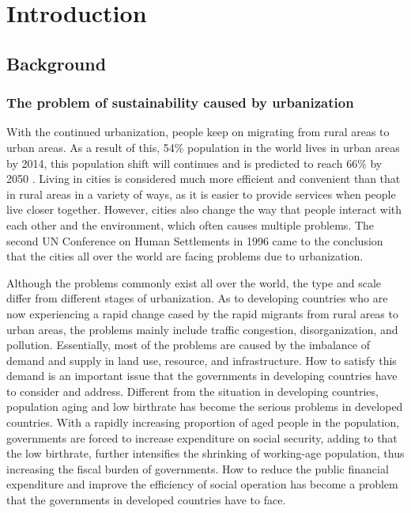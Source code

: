 \chapter{Introduction}

%
\section{Background}

\subsection{The problem of sustainability caused by urbanization}
With the continued urbanization, people keep on migrating from rural areas to urban areas. As a result of this, 54\% population in the world lives in urban areas by 2014, this population shift will continues and is predicted to reach 66\% by 2050 \cite{un2014world}. Living in cities is considered much more efficient and convenient than that in rural areas in a variety of ways, as it is easier to provide services when people live closer together. However, cities also change the way that people interact with each other and the environment, which often causes multiple problems. The second UN Conference on Human Settlements in 1996 came to the conclusion that the cities all over the world are facing problems due to urbanization.

Although the problems commonly exist all over the world, the type and scale differ from different stages of urbanization. As to developing countries who are now experiencing a rapid change cased by the rapid migrants from rural areas to urban areas, the problems mainly include traffic congestion, disorganization, and pollution. Essentially, most of the problems are caused by the imbalance of demand and supply in land use, resource, and infrastructure. How to satisfy this demand is an important issue that the governments in developing countries have to consider and address. Different from the situation in developing countries, population aging and low birthrate has become the serious problems in developed countries. With a rapidly increasing proportion of aged people in the population, governments are forced to increase expenditure on social security, adding to that the low birthrate, further intensifies the shrinking of working-age population, thus increasing the fiscal burden of governments. How to reduce the public financial expenditure and improve the efficiency of social operation has become a problem that the governments in developed countries have to face. 

